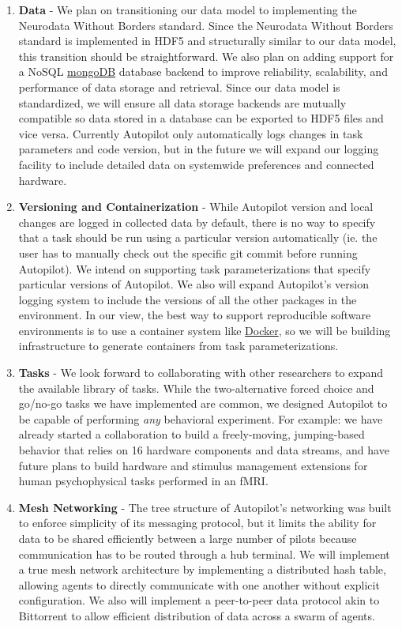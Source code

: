 \begin{enumerate}[ref=\thechapter.\arabic*]
    \item \textbf{Data} - We plan on transitioning our data model to implementing the Neurodata Without Borders\citep{rubelNWBAccessibleData2019} standard.  Since the Neurodata Without Borders standard is implemented in HDF5 and structurally similar to our data model, this transition should be straightforward. We also plan on adding support for a NoSQL \href{https://www.mongodb.com/}{mongoDB} database backend to improve reliability, scalability, and performance of data storage and retrieval. Since our data model is standardized, we will ensure all data storage backends are mutually compatible so data stored in a database can be exported to HDF5 files and vice versa. Currently Autopilot only automatically logs changes in task parameters and code version, but in the future we will expand our logging facility to include detailed data on systemwide preferences and connected hardware. 
    \item \textbf{Versioning and Containerization} - While Autopilot version and local changes are logged in collected data by default, there is no way to specify that a task should be run using a particular version automatically (ie. the user has to manually check out the specific git commit before running Autopilot). We intend on supporting task parameterizations that specify particular versions of Autopilot. We also will expand Autopilot's version logging system to include the versions of all the other packages in the environment. In our view, the best way to support reproducible software environments is to use a container system like \href{https://www.docker.com/}{Docker}, so we will be building infrastructure to generate containers from task parameterizations.
    \item \textbf{Tasks} - We look forward to collaborating with other researchers to expand the available library of tasks. While the two-alternative forced choice and go/no-go tasks we have implemented are common, we designed Autopilot to be capable of performing \textit{any} behavioral experiment. For example: we have already started a collaboration to build a freely-moving, jumping-based behavior that relies on 16 hardware components and data streams, and have future plans to build hardware and stimulus management extensions for human psychophysical tasks performed in an fMRI. 
    \item \label{future:network}\textbf{Mesh Networking} - The tree structure of Autopilot's networking was built to enforce simplicity of its messaging protocol, but it limits the ability for data to be shared efficiently between a large number of pilots because communication has to be routed through a hub terminal. We will implement a true mesh network architecture by implementing a distributed hash table, allowing agents to directly communicate with one another without explicit configuration. We also will implement a peer-to-peer data protocol akin to Bittorrent to allow efficient distribution of data across a swarm of agents.

\end{enumerate}
